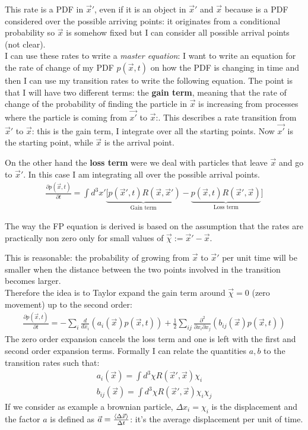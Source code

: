 \documentclass[\main/main.tex]{subfiles}
\begin{document}
\medskip

This rate is a PDF in $\Vec{x}'$, even if it is an object in $\Vec{x}'$ and $\Vec{x}$ because is a PDF considered over the possible arriving points: it originates from a conditional probability so $\Vec{x}$ is somehow fixed but I can consider all possible arrival points (not clear). \\

I can use these rates to write a \textit{master equation}: I want to write an equation for the rate of change of my PDF $p(\Vec{x},t)$ on how the PDF is changing in time and then I can use my transition rates to write the following equation. The point is that I will have two different terms: the \textbf{gain term}, meaning that the rate of change of the probability of finding the particle in $\Vec{x}$ is increasing from processes where the particle is coming from $\Vec{x'}$ to $\Vec{x}$:. This describes a rate transition from $\Vec{x}'$ to $\Vec{x}$: this is the gain term, I integrate over all the starting points. Now $\Vec{x'}$ is the starting point, while $\Vec{x}$ is the arrival point.

On the other hand the \textbf{loss term} were we deal with particles that leave $\Vec{x}$ and go to $\Vec{x}'$. In this case I am integrating all over the possible arrival points.
\begin{eqnarray}
\frac{\partial p(\Vec{x},t)}{\partial t}= \int d^3x' \underbrace{[p(\Vec{x}',t)R(\Vec{x},\Vec{x}')}_\text{{Gain term}}-\underbrace{p(\Vec{x},t)R(\Vec{x}',\Vec{x})}_{\text{Loss term}}]
\end{eqnarray}

The way the FP equation is derived is based on the assumption that the rates are practically non zero only for small values of $\Vec{\chi}:=\Vec{x}'-\Vec{x}$. 

This is reasonable: the probability of growing from $\Vec{x}$ to $\Vec{x}'$ per unit time will be smaller when the distance between the two points involved in the transition becomes larger. \\

Therefore the idea is to Taylor expand the gain term around $\Vec{\chi}=0$ (zero movement) up to the second order:
\begin{eqnarray}
\frac{\partial p(\Vec{x},t)}{\partial t}=-\sum_i \frac{d}{dx_i}(a_i(\Vec{x})p(\Vec{x},t))+\frac{1}{2}\sum_{ij}\frac{\partial^2}{\partial x_i\partial x_j}(b_{ij}(\Vec{x})p(\Vec{x},t))
\end{eqnarray}
The zero order expansion cancels the loss term and one is left with the first and second order expansion terms.
Formally I can relate the quantities $a,b$ to the transition rates such that:
\begin{eqnarray}
a_i(\Vec{x})=\int d^3\chi R(\Vec{x}',\Vec{x})\chi_i \\
b_{ij}(\Vec{x})=\int d^3\chi R(\Vec{x}',\Vec{x}) \chi_i \chi_j
\end{eqnarray}
If we consider as example a brownian particle,
$\Delta x_i=\chi_i$ is the displacement and the factor $a$ is defined as $\Vec{a}=\frac{\left\langle \Delta\Vec{x} \right\rangle}{\Delta
t}$: it's the average displacement per unit of time.
\end{document}
